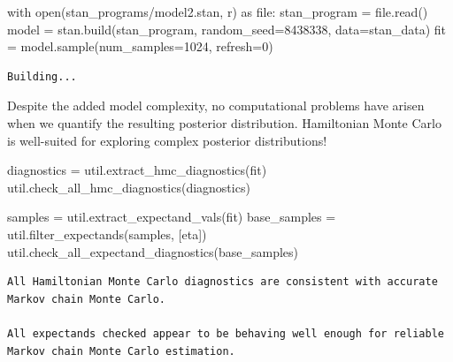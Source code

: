 \documentclass[
  letterpaper,
  DIV=11,
  numbers=noendperiod]{scrartcl}
\newenvironment{Shaded}{\begin{snugshade}}{\end{snugshade}}
\newcommand{\BuiltInTok}[1]{\textcolor[rgb]{0.00,0.23,0.31}{#1}}
\newcommand{\ControlFlowTok}[1]{\textcolor[rgb]{0.00,0.23,0.31}{#1}}
\newcommand{\DecValTok}[1]{\textcolor[rgb]{0.68,0.00,0.00}{#1}}
\newcommand{\ImportTok}[1]{\textcolor[rgb]{0.00,0.46,0.62}{#1}}
\newcommand{\NormalTok}[1]{\textcolor[rgb]{0.00,0.23,0.31}{#1}}
\newcommand{\OperatorTok}[1]{\textcolor[rgb]{0.37,0.37,0.37}{#1}}
\newcommand{\StringTok}[1]{\textcolor[rgb]{0.13,0.47,0.30}{#1}}
\begin{document}
\begin{Shaded}
\begin{Highlighting}[]
\ControlFlowTok{with} \BuiltInTok{open}\NormalTok{(}\StringTok{\textquotesingle{}stan\_programs/model2.stan\textquotesingle{}}\NormalTok{, }\StringTok{\textquotesingle{}r\textquotesingle{}}\NormalTok{) }\ImportTok{as} \BuiltInTok{file}\NormalTok{:}
\NormalTok{  stan\_program }\OperatorTok{=} \BuiltInTok{file}\NormalTok{.read()}
\NormalTok{model }\OperatorTok{=}\NormalTok{ stan.build(stan\_program,}
\NormalTok{                   random\_seed}\OperatorTok{=}\DecValTok{8438338}\NormalTok{,}
\NormalTok{                   data}\OperatorTok{=}\NormalTok{stan\_data)}
\NormalTok{fit }\OperatorTok{=}\NormalTok{ model.sample(num\_samples}\OperatorTok{=}\DecValTok{1024}\NormalTok{, refresh}\OperatorTok{=}\DecValTok{0}\NormalTok{)}
\end{Highlighting}
\end{Shaded}

\begin{verbatim}
Building...
\end{verbatim}

Despite the added model complexity, no computational problems have
arisen when we quantify the resulting posterior distribution.
Hamiltonian Monte Carlo is well-suited for exploring complex posterior
distributions!

\begin{Shaded}
\begin{Highlighting}[]
\NormalTok{diagnostics }\OperatorTok{=}\NormalTok{ util.extract\_hmc\_diagnostics(fit)}
\NormalTok{util.check\_all\_hmc\_diagnostics(diagnostics)}

\NormalTok{samples }\OperatorTok{=}\NormalTok{ util.extract\_expectand\_vals(fit)}
\NormalTok{base\_samples }\OperatorTok{=}\NormalTok{ util.filter\_expectands(samples, [}\StringTok{\textquotesingle{}eta\textquotesingle{}}\NormalTok{])}
\NormalTok{util.check\_all\_expectand\_diagnostics(base\_samples)}
\end{Highlighting}
\end{Shaded}

\begin{verbatim}
All Hamiltonian Monte Carlo diagnostics are consistent with accurate
Markov chain Monte Carlo.
 
All expectands checked appear to be behaving well enough for reliable
Markov chain Monte Carlo estimation.
 
\end{verbatim}
\end{document}
